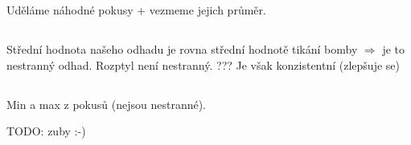 \documentclass[a4paper]{article}
\begin{document}
\thispagestyle{fancy} %
{}

\section{}
\subsection{}
Uděláme náhodné pokusy + vezmeme jejich průměr.

\subsection{}
Střední hodnota našeho odhadu je rovna střední hodnotě tikání bomby $\Rightarrow$ je to nestranný odhad.
Rozptyl není nestranný. ??? Je však konzistentní (zlepšuje se)

\subsection{}
Min a max z pokusů (nejsou nestranné). 

TODO: zuby :-)
\end{document}

